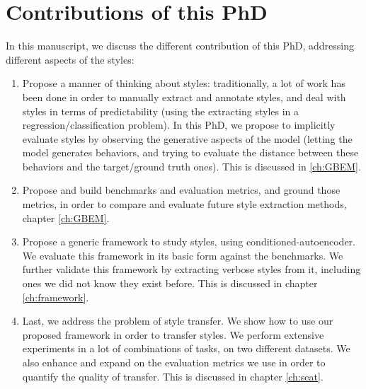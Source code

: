 \section{Contributions of this PhD}
\par In this manuscript, we discuss the different contribution of this PhD, addressing different aspects of the styles:
\begin{enumerate}
  \item Propose a manner of thinking about styles: traditionally, a lot of work has been done in order to manually extract and annotate styles, and deal with styles in terms of predictability (using the extracting styles in a regression/classification problem). In this PhD, we propose to implicitly evaluate styles by observing the generative aspects of the model (letting the model generates behaviors, and trying to evaluate the distance between these behaviors and the target/ground truth ones). This is discussed in \ref{ch:GBEM}.
  \item Propose and build benchmarks and evaluation metrics, and ground those metrics, in order to compare and evaluate future style extraction methods, chapter \ref{ch:GBEM}.
  \item Propose a generic framework to study styles, using conditioned-autoencoder. We evaluate this framework in its basic form against the benchmarks. We further validate this framework by extracting verbose styles from it, including ones we did not know they exist before. This is discussed in chapter \ref{ch:framework}.
  \item Last, we address the problem of style transfer. We show how to use our proposed framework in order to transfer styles. We perform extensive experiments in a lot of combinations of tasks, on two different datasets. We also enhance and expand on the evaluation metrics we use in order to quantify the quality of transfer. This is discussed in chapter \ref{ch:seat}.
\end{enumerate}

